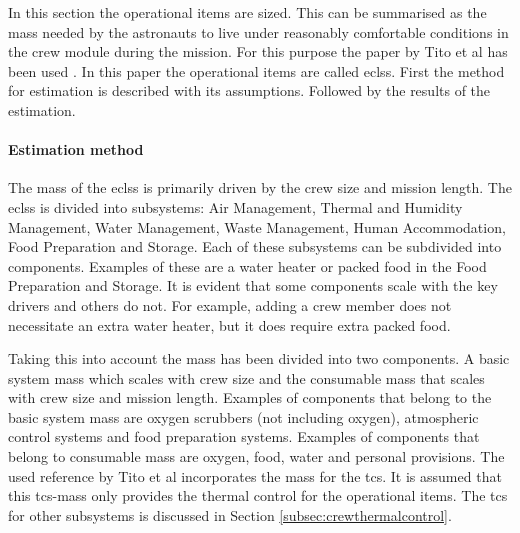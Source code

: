 In this section the operational items are sized. This can be summarised as the mass needed by the astronauts to live under reasonably comfortable conditions in the crew module during the mission. For this purpose the paper by Tito et al has been used \cite{Tito2013}. In this paper the operational items are called \acrfull{eclss}. First the method for estimation is described with its assumptions. Followed by the results of the estimation.

\paragraph{Estimation method}
The mass of the \gls{eclss} is primarily driven by the crew size and mission length. The \gls{eclss} is divided into subsystems: Air Management, Thermal and Humidity Management, Water Management, Waste Management, Human Accommodation, Food Preparation and Storage. Each of these subsystems can be subdivided into components. Examples of these are a water heater or packed food in the Food Preparation and Storage. It is evident that some components scale with the key drivers and others do not. For example, adding a crew member does not necessitate an extra water heater, but it does require extra packed food. 


Taking this into account the mass has been divided into two components. A basic system mass which scales with crew size and the consumable mass that scales with crew size and mission length. Examples of components that belong to the basic system mass are oxygen scrubbers (not including oxygen), atmospheric control systems and food preparation systems. Examples of components that belong to consumable mass are oxygen, food, water and personal provisions. The used reference by Tito et al \cite{Tito2013} incorporates the mass for the \gls{tcs}. It is assumed that this \gls{tcs}-mass only provides the thermal control for the operational items. The \gls{tcs} for other subsystems is discussed in Section \ref{subsec:crewthermalcontrol}.

